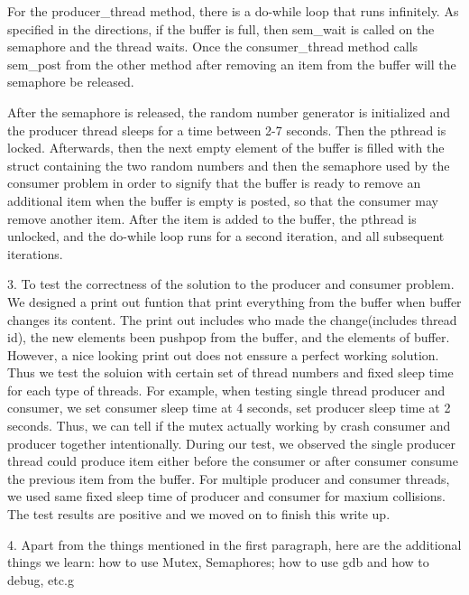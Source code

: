 \documentclass[letterpaper,10pt]{article}
\begin{document}
For the producer\_thread method, there is a do-while loop that runs infinitely. As specified in the directions, if the buffer is full, then sem\_wait is called on the semaphore and the thread waits. Once the consumer\_thread method calls sem\_post from the other method after removing an item from the buffer will the semaphore be released.\par

After the semaphore is released, the random number generator is initialized and the producer thread sleeps for a time between 2-7 seconds. Then the pthread is locked. Afterwards, then the next empty element of the buffer is filled with the struct containing the two random numbers and then the semaphore used by the consumer problem in order to signify that the buffer is ready to remove an additional item when the buffer is empty is posted, so that the consumer may remove another item. After the item is added to the buffer, the pthread is unlocked, and the do-while loop runs for a second iteration, and all subsequent iterations.\par

3.
To test the correctness of the solution to the producer and consumer problem. We designed a print out funtion that print everything from the buffer when buffer changes its content. The print out includes who made the change(includes thread id), the new elements been push\/pop from the buffer, and the elements of buffer. However, a nice looking print out does not enssure a perfect working solution. Thus we test the soluion with certain set of thread numbers and fixed sleep time for each type of threads. For example, when testing single thread producer and consumer, we set consumer sleep time at 4 seconds, set producer sleep time at 2 seconds. Thus, we can tell if the mutex actually working by crash consumer and producer together intentionally. During our test, we observed the single producer thread could produce item either before the consumer or after consumer consume the previous item from the buffer. For multiple producer and consumer threads, we used same fixed sleep time of producer and consumer for maxium collisions. The test results are positive and we moved on to finish this write up.    

4.
Apart from the things mentioned in the first paragraph, here are the additional things we learn: how to use Mutex, Semaphores; how to use gdb and how to debug, etc.g
\end{document}
